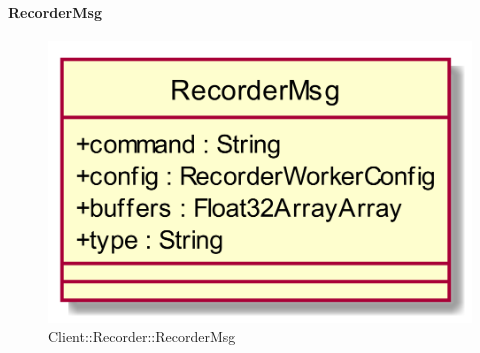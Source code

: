 \hypertarget{RecorderMsg_label}{\paragraph{RecorderMsg}}
\begin{figure}[h]
	\centering
	\includegraphics[width=\textwidth,height=\textheight,keepaspectratio]{images/ClassRecorderMsg.png}
	\caption{Client::Recorder::RecorderMsg}
\end{figure}
